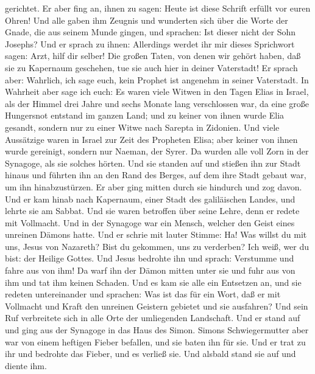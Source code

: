 gerichtet.  Er aber fing an, ihnen zu sagen: Heute ist
diese Schrift erfüllt vor euren Ohren!  Und alle gaben
ihm Zeugnis und wunderten sich über die Worte der Gnade, die aus seinem
Munde gingen, und sprachen: Ist dieser nicht der Sohn Josephs?
 Und er sprach zu ihnen: Allerdings werdet ihr mir dieses
Sprichwort sagen: Arzt, hilf dir selber! Die großen Taten, von denen wir
gehört haben, daß sie zu Kapernaum geschehen, tue sie auch hier in
deiner Vaterstadt!  Er sprach aber: Wahrlich, ich sage
euch, kein Prophet ist angenehm in seiner Vaterstadt.  In
Wahrheit aber sage ich euch: Es waren viele Witwen in den Tagen Elias in
Israel, als der Himmel drei Jahre und sechs Monate lang verschlossen
war, da eine große Hungersnot entstand im ganzen Land; 
und zu keiner von ihnen wurde Elia gesandt, sondern nur zu einer Witwe
nach Sarepta in Zidonien.  Und viele Aussätzige waren in
Israel zur Zeit des Propheten Elisa; aber keiner von ihnen wurde
gereinigt, sondern nur Naeman, der Syrer.  Da wurden alle
voll Zorn in der Synagoge, als sie solches hörten.  Und
sie standen auf und stießen ihn zur Stadt hinaus und führten ihn an den
Rand des Berges, auf dem ihre Stadt gebaut war, um ihn hinabzustürzen.
 Er aber ging mitten durch sie hindurch und zog davon.
 Und er kam hinab nach Kapernaum, einer Stadt des
galiläischen Landes, und lehrte sie am Sabbat.  Und sie
waren betroffen über seine Lehre, denn er redete mit Vollmacht.
 Und in der Synagoge war ein Mensch, welcher den Geist
eines unreinen Dämons hatte. Und er schrie mit lauter Stimme:
 Ha! Was willst du mit uns, Jesus von Nazareth? Bist du
gekommen, uns zu verderben? Ich weiß, wer du bist: der Heilige Gottes.
 Und Jesus bedrohte ihn und sprach: Verstumme und fahre
aus von ihm! Da warf ihn der Dämon mitten unter sie und fuhr aus von ihm
und tat ihm keinen Schaden.  Und es kam sie alle ein
Entsetzen an, und sie redeten untereinander und sprachen: Was ist das
für ein Wort, daß er mit Vollmacht und Kraft den unreinen Geistern
gebietet und sie ausfahren?  Und sein Ruf verbreitete
sich in alle Orte der umliegenden Landschaft.  Und er
stand auf und ging aus der Synagoge in das Haus des Simon. Simons
Schwiegermutter aber war von einem heftigen Fieber befallen, und sie
baten ihn für sie.  Und er trat zu ihr und bedrohte das
Fieber, und es verließ sie. Und alsbald stand sie auf und diente ihm.
